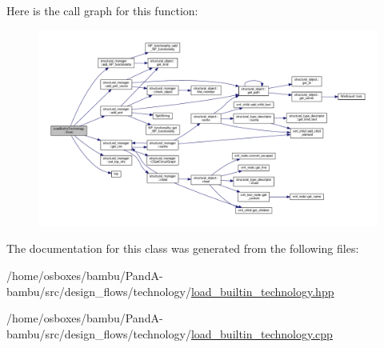 Here is the call graph for this function\+:
\nopagebreak
\begin{figure}[H]
\begin{center}
\leavevmode
\includegraphics[width=350pt]{d2/dd4/classLoadBuiltinTechnology_ab0fb4115da509336a908c1ea53e0140c_cgraph}
\end{center}
\end{figure}


The documentation for this class was generated from the following files\+:\begin{DoxyCompactItemize}
\item 
/home/osboxes/bambu/\+Pand\+A-\/bambu/src/design\+\_\+flows/technology/\hyperlink{load__builtin__technology_8hpp}{load\+\_\+builtin\+\_\+technology.\+hpp}\item 
/home/osboxes/bambu/\+Pand\+A-\/bambu/src/design\+\_\+flows/technology/\hyperlink{load__builtin__technology_8cpp}{load\+\_\+builtin\+\_\+technology.\+cpp}\end{DoxyCompactItemize}
